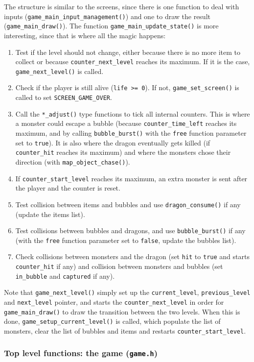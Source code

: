 \documentclass[12pt,a4paper]{article}
\newcommand{\cc}[1]{\texttt{#1}}
\begin{document}
The structure is similar to the screens, since there is one function to deal with inputs (\cc{game_main_input_management()}) and one to draw the result (\cc{game_main_draw()}). The function \cc{game_main_update_state()} is more interesting, since that is where all the magic happens:\begin{enumerate}
\item Test if the level should not change, either because there is no more item to collect or because \cc{counter_next_level} reaches its maximum. If it is the case, \cc{game_next_level()} is called.
\item Check if the player is still alive (\cc{life >= 0}). If not, \cc{game_set_screen()} is called to set \cc{SCREEN_GAME_OVER}.
\item Call the \cc{*_adjust()} type functions to tick all internal counters. This is where a monster could escape a bubble (because \cc{counter_time_left} reaches its maximum, and by calling \cc{bubble_burst()} with the \cc{free} function parameter set to \cc{true}). It is also where the dragon eventually gets killed (if \cc{counter_hit} reaches its maximum) and where the monsters chose their direction (with \cc{map_object_chase()}).
\item If \cc{counter_start_level} reaches its maximum, an extra monster is sent after the player and the counter is reset.
\item Test collision between items and bubbles and use \cc{dragon_consume()} if any (update the items list).
\item Test collisions between bubbles and dragons, and use \cc{bubble_burst()} if any (with the \cc{free} function parameter set to \cc{false}, update the bubbles list).
\item Check collisions between monsters and the dragon (set \cc{hit} to \cc{true} and starts \cc{counter_hit} if any) and collision between monsters and bubbles (set \cc{in_bubble} and \cc{captured} if any).
\end{enumerate}
Note that \cc{game_next_level()} simply set up the \cc{current_level}, \cc{previous_level} and \cc{next_level} pointer, and starts the \cc{counter_next_level} in order for \cc{game_main_draw()} to draw the transition between the two levels. When this is done, \cc{game_setup_current_level()} is called, which populate the list of monsters, clear the list of bubbles and items and restarts \cc{counter_start_level}.

\subsubsection{Top level functions: the game (\texttt{game.h})}
\end{document}

